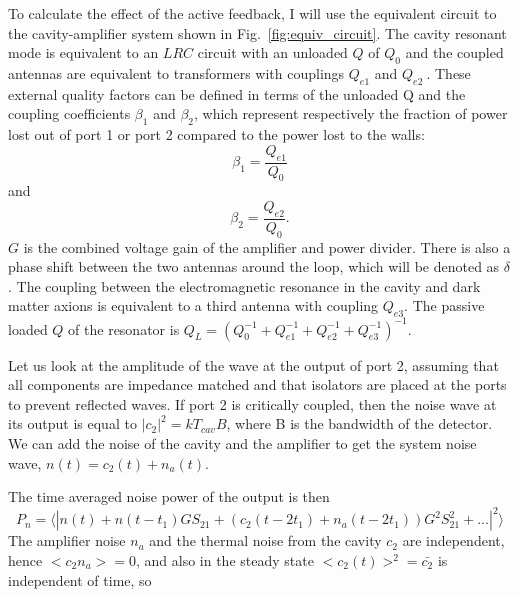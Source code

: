 \documentclass[aps,prl,twocolumn,groupedaddress]{revtex4-1}
\begin{document}
To calculate the effect of the active feedback, I will use the equivalent circuit to the cavity-amplifier system shown in Fig.~\ref{fig:equiv_circuit}.  The cavity resonant mode is equivalent to an $LRC$ circuit with an unloaded $Q$ of $Q_0$ and the coupled antennas are equivalent to transformers with couplings $Q_{e1}$ and $Q_{e2}~$\cite{Montgomery:1948}.  These external quality factors can be defined in terms of the unloaded Q and the coupling coefficients $\beta_1$ and $\beta_2$, which represent respectively the fraction of power lost out of port 1 or port 2 compared to the power lost to the walls: $$\beta_1 = \frac{Q_{e1} }{Q_0}$$ and $$\beta_2 = \frac{Q_{e2}}{Q_0}.$$ $G$ is the combined voltage gain of the amplifier and power divider.  There is also a phase shift between the two antennas around the loop, which will be denoted as $\delta$.  The coupling between the electromagnetic resonance in the cavity and dark matter axions is equivalent to a third antenna with coupling $Q_{e3}$.  The passive loaded $Q$ of the resonator is $Q_L=\left(Q_0^{-1}+Q_{e1}^{-1}+Q_{e2}^{-1}+Q_{e3}^{-1}\right)^{-1}$.


Let us look at the amplitude of the wave at the output of port 2, assuming that all components are impedance matched and that isolators are placed at the ports to prevent reflected waves. If port 2 is critically coupled, then the noise wave at its output is equal to $|c_2|^2 =kT_{cav}B$, where B is the bandwidth of the detector. We can add the noise of the cavity and the amplifier to get the system noise wave, $n(t) = c_2(t)+n_a(t)$.

The time averaged noise power of the output is then
\begin{equation}
P_n = \langle |n(t) + n(t-t_1)GS_{21} + (c_2(t-2t_1)+n_a(t-2t_1))G^2S_{21}^2 + \ldots|^2 \rangle
\end{equation}
The amplifier noise $n_a$ and the thermal noise from the cavity $c_2$ are independent, hence $<c_2n_a> = 0$, and also in the steady state $<c_2(t)>^2 = \bar{c_2}$ is independent of time, so
\end{document}
